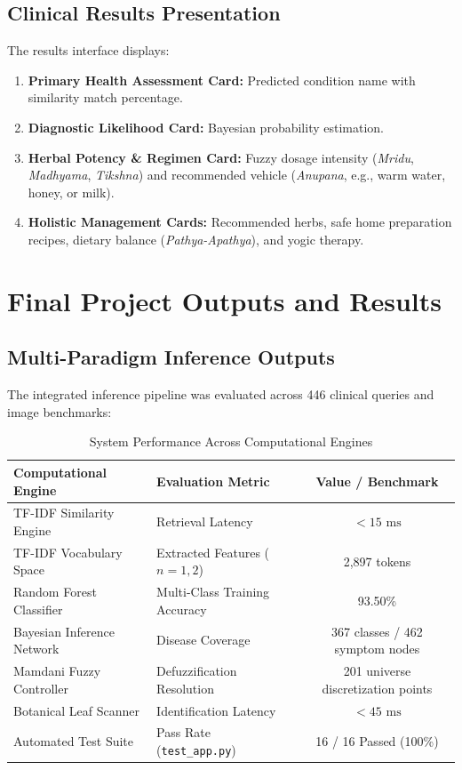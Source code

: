 \documentclass[12pt,a4paper]{article}
\begin{document}
\subsection{Clinical Results Presentation}
The results interface displays:
\begin{enumerate}
    \item \textbf{Primary Health Assessment Card:} Predicted condition name with similarity match percentage.
    \item \textbf{Diagnostic Likelihood Card:} Bayesian probability estimation.
    \item \textbf{Herbal Potency \& Regimen Card:} Fuzzy dosage intensity (\textit{Mridu}, \textit{Madhyama}, \textit{Tikshna}) and recommended vehicle (\textit{Anupana}, e.g., warm water, honey, or milk).
    \item \textbf{Holistic Management Cards:} Recommended herbs, safe home preparation recipes, dietary balance (\textit{Pathya-Apathya}), and yogic therapy.
\end{enumerate}

\newpage
\section{Final Project Outputs and Results}

\subsection{Multi-Paradigm Inference Outputs}
The integrated inference pipeline was evaluated across 446 clinical queries and image benchmarks:

\begin{table}[H]
\centering
\caption{System Performance Across Computational Engines}
\label{tab:systemmetrics}
\begin{tabular}{|l|l|c|}
\hline
\textbf{Computational Engine} & \textbf{Evaluation Metric} & \textbf{Value / Benchmark} \\
\hline
TF-IDF Similarity Engine & Retrieval Latency & $< 15\text{ ms}$ \\
TF-IDF Vocabulary Space & Extracted Features ($n=1, 2$) & 2,897 tokens \\
Random Forest Classifier & Multi-Class Training Accuracy & 93.50\% \\
Bayesian Inference Network & Disease Coverage & 367 classes / 462 symptom nodes \\
Mamdani Fuzzy Controller & Defuzzification Resolution & 201 universe discretization points \\
Botanical Leaf Scanner & Identification Latency & $< 45\text{ ms}$ \\
Automated Test Suite & Pass Rate (\texttt{test\_app.py}) & 16 / 16 Passed (100\%) \\
\hline
\end{tabular}
\end{table}
\end{document}
